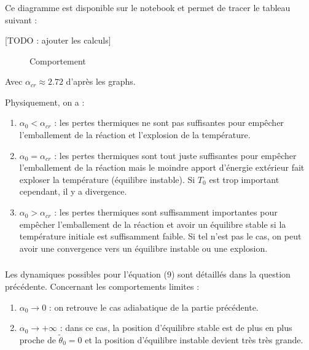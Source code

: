 \documentclass[10pt,a4paper,twocolumn]{report}
\begin{document}
	\subsubsection{} %

	Ce diagramme est disponible sur le notebook et permet de tracer le tableau suivant :

	[TODO : ajouter les calculs]
	
	\begin{figure*}
	\caption{Comportement }
	\end{figure*}
	
	Avec $\alpha_{cr} \approx 2.72$ d'après les graphs.
	
	Physiquement, on a :
	\begin{enumerate}
		\item $\alpha_0 < \alpha_{cr}$ : les pertes thermiques ne sont pas suffisantes pour empêcher l'emballement de la réaction et l'explosion de la température.
		\item $\alpha_0 = \alpha_{cr}$ : les pertes thermiques sont tout juste suffisantes pour empêcher l'emballement de la réaction mais le moindre apport d'énergie extérieur fait exploser la température (équilibre instable). Si $T_0$ est trop important cependant, il y a divergence.
		\item $\alpha_0 > \alpha_{cr}$ : les pertes thermiques sont suffisamment importantes pour empêcher l'emballement de la réaction et avoir un équilibre stable si la température initiale est suffisamment faible. Si tel n'est pas le cas, on peut avoir une convergence vers un équilibre instable ou une explosion.
	\end{enumerate}
	
	\subsubsection{} %
	Les dynamiques possibles pour l'équation (9) sont détaillés dans la question précédente. Concernant les comportements limites : 
	\begin{enumerate}
		\item $\alpha_0 \rightarrow 0$ : on retrouve le cas adiabatique de la partie précédente.
		\item $\alpha_0 \rightarrow + \infty$ : dans ce cas, la position d'équilibre stable est de plus en plus proche de $\tilde{\theta}_0 = 0$ et la position d'équilibre instable devient très très grande.
	\end{enumerate}	
	
\end{document}
